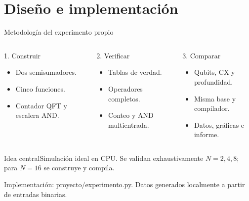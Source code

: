 \documentclass[aspectratio=169,12pt]{beamer}
\newcommand{\fuente}[1]{\vfill{\color{gris}\tiny #1\par}}
\newcommand{\idea}[1]{\begin{alertblock}{Idea central}#1\end{alertblock}}
\begin{document}
\section{Diseño e implementación}
\begin{frame}[shrink=0]{Metodología del experimento propio}
\small
\begin{columns}[T,onlytextwidth]
\begin{block}{1. Construir}
\begin{itemize}
\item Dos semisumadores.
\item Cinco funciones.
\item Contador QFT y escalera AND.
\end{itemize}
\end{block}
\begin{block}{2. Verificar}
\begin{itemize}
\item Tablas de verdad.
\item Operadores completos.
\item Conteo y AND multientrada.
\end{itemize}
\end{block}
\begin{block}{3. Comparar}
\begin{itemize}
\item Qubits, CX y profundidad.
\item Misma base y compilador.
\item Datos, gráficas e informe.
\end{itemize}
\end{block}
\end{columns}
\smallskip
\idea{Simulación ideal en CPU. Se validan exhaustivamente $N=2,4,8$;
para $N=16$ se construye y compila.}
\fuente{Implementación: proyecto/experimento.py. Datos generados localmente a partir de entradas binarias.}
\end{frame}
\end{document}
